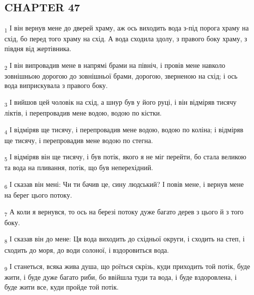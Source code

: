 \subsection{CHAPTER 47}
\begin{tcolorbox}
\textsubscript{1} І він вернув мене до дверей храму, аж ось виходить вода з-під порога храму на схід, бо перед того храму на схід. А вода сходила здолу, з правого боку храму, з півдня від жертівника.
\end{tcolorbox}
\begin{tcolorbox}
\textsubscript{2} І він випровадив мене в напрямі брами на північ, і провів мене навколо зовнішньою дорогою до зовнішньої брами, дорогою, зверненою на схід; і ось вода виприскувала з правого боку.
\end{tcolorbox}
\begin{tcolorbox}
\textsubscript{3} І вийшов цей чоловік на схід, а шнур був у його руці, і він відміряв тисячу ліктів, і перепровадив мене водою, водою по кістки.
\end{tcolorbox}
\begin{tcolorbox}
\textsubscript{4} І відміряв ще тисячу, і перепровадив мене водою, водою по коліна; і відміряв ще тисячу, і перепровадив мене водою по стегна.
\end{tcolorbox}
\begin{tcolorbox}
\textsubscript{5} І відміряв він ще тисячу, і був потік, якого я не міг перейти, бо стала великою та вода на пливання, потік, що був неперехідний.
\end{tcolorbox}
\begin{tcolorbox}
\textsubscript{6} І сказав він мені: Чи ти бачив це, сину людський? І повів мене, і вернув мене на берег цього потоку.
\end{tcolorbox}
\begin{tcolorbox}
\textsubscript{7} А коли я вернувся, то ось на березі потоку дуже багато дерев з цього й з того боку.
\end{tcolorbox}
\begin{tcolorbox}
\textsubscript{8} І сказав він до мене: Ця вода виходить до східньої округи, і сходить на степ, і сходить до моря, до води солоної, і вздоровиться вода.
\end{tcolorbox}
\begin{tcolorbox}
\textsubscript{9} І станеться, всяка жива душа, що роїться скрізь, куди приходить той потік, буде жити, і буде дуже багато риби, бо ввійшла туди та вода, і буде вздоровлена, і буде жити все, куди пройде той потік.
\end{tcolorbox}
